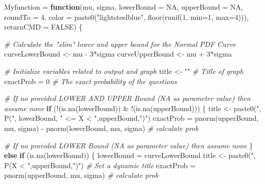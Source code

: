 \documentclass[
  12pt,
]{article}
\newenvironment{Shaded}{\begin{snugshade}}{\end{snugshade}}
\newcommand{\AttributeTok}[1]{\textcolor[rgb]{0.77,0.63,0.00}{#1}}
\newcommand{\CommentTok}[1]{\textcolor[rgb]{0.56,0.35,0.01}{\textit{#1}}}
\newcommand{\ConstantTok}[1]{\textcolor[rgb]{0.00,0.00,0.00}{#1}}
\newcommand{\ControlFlowTok}[1]{\textcolor[rgb]{0.13,0.29,0.53}{\textbf{#1}}}
\newcommand{\DecValTok}[1]{\textcolor[rgb]{0.00,0.00,0.81}{#1}}
\newcommand{\FunctionTok}[1]{\textcolor[rgb]{0.00,0.00,0.00}{#1}}
\newcommand{\NormalTok}[1]{#1}
\newcommand{\OtherTok}[1]{\textcolor[rgb]{0.56,0.35,0.01}{#1}}
\newcommand{\SpecialCharTok}[1]{\textcolor[rgb]{0.00,0.00,0.00}{#1}}
\newcommand{\StringTok}[1]{\textcolor[rgb]{0.31,0.60,0.02}{#1}}
\begin{document}
\begin{Shaded}
\begin{Highlighting}[]
\NormalTok{    Myfunction }\OtherTok{=} \ControlFlowTok{function}\NormalTok{(mu, sigma, }
                          \AttributeTok{lowerBound =} \ConstantTok{NA}\NormalTok{, }\AttributeTok{upperBound =} \ConstantTok{NA}\NormalTok{, }
                          \AttributeTok{roundTo =} \DecValTok{4}\NormalTok{, }
                          \AttributeTok{color =} \FunctionTok{paste0}\NormalTok{(}\StringTok{"lightsteelblue"}\NormalTok{, }\FunctionTok{floor}\NormalTok{(}\FunctionTok{runif}\NormalTok{(}\DecValTok{1}\NormalTok{, }\AttributeTok{min=}\DecValTok{1}\NormalTok{, }\AttributeTok{max=}\DecValTok{4}\NormalTok{))),}
                          \AttributeTok{returnCMD =} \ConstantTok{FALSE}\NormalTok{)}
\NormalTok{    \{}
      
      \CommentTok{\# Calculate the "xlim" lower and upper bound for the Normal PDF Curve}
\NormalTok{      curveLowerBound }\OtherTok{\textless{}{-}}\NormalTok{ mu }\SpecialCharTok{{-}} \DecValTok{3}\SpecialCharTok{*}\NormalTok{sigma}
\NormalTok{      curveUpperBound }\OtherTok{\textless{}{-}}\NormalTok{ mu }\SpecialCharTok{+} \DecValTok{3}\SpecialCharTok{*}\NormalTok{sigma}
      
      \CommentTok{\# Initialize variables related to output and graph}
\NormalTok{      title }\OtherTok{\textless{}{-}} \StringTok{""}   \CommentTok{\# Title of graph}
\NormalTok{      exactProb }\OtherTok{=} \DecValTok{0} \CommentTok{\# The exact probability of the questions}
      
      \CommentTok{\# If no provided LOWER AND UPPER Bound (NA as parameter value) then assume none}
      \ControlFlowTok{if}\NormalTok{ (}\SpecialCharTok{!}\NormalTok{(}\FunctionTok{is.na}\NormalTok{(lowerBound)) }\SpecialCharTok{\&} \SpecialCharTok{!}\NormalTok{(}\FunctionTok{is.na}\NormalTok{(upperBound))) \{}
\NormalTok{        title }\OtherTok{\textless{}{-}} \FunctionTok{paste0}\NormalTok{(}\StringTok{", P("}\NormalTok{, lowerBound, }\StringTok{" \textless{}= X \textless{} "}\NormalTok{,upperBound,}\StringTok{")"}\NormalTok{)}
\NormalTok{        exactProb }\OtherTok{=} \FunctionTok{pnorm}\NormalTok{(upperBound, mu, sigma) }\SpecialCharTok{{-}} \FunctionTok{pnorm}\NormalTok{(lowerBound, mu, sigma) }\CommentTok{\# calculate prob }
        
      \CommentTok{\# If no provided LOWER Bound (NA as parameter value) then assume none}
\NormalTok{      \} }\ControlFlowTok{else} \ControlFlowTok{if}\NormalTok{ (}\FunctionTok{is.na}\NormalTok{(lowerBound)) \{}
\NormalTok{        lowerBound }\OtherTok{=}\NormalTok{ curveLowerBound}
\NormalTok{        title }\OtherTok{\textless{}{-}} \FunctionTok{paste0}\NormalTok{(}\StringTok{", P(X \textless{} "}\NormalTok{,upperBound,}\StringTok{")"}\NormalTok{) }\CommentTok{\# Set a dynamic title}
\NormalTok{        exactProb }\OtherTok{=} \FunctionTok{pnorm}\NormalTok{(upperBound, mu, sigma) }\CommentTok{\# calculate prob }
        

\end{Highlighting}
\end{Shaded}
\end{document}
